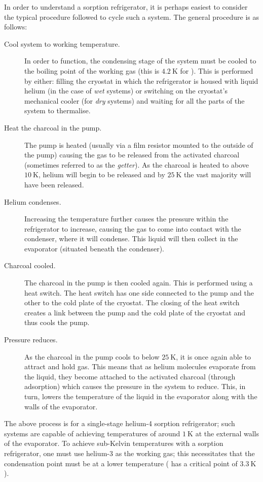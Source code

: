 \par
In order to understand a sorption refrigerator, it is perhaps easiest to consider the typical procedure followed to cycle such a system. The general procedure is as follows:
\begin{description}
\item[Cool system to working temperature.] In order to function, the condensing stage of the system must be cooled to the boiling point of the working gas (this is $4.2~\mathrm{K}$ for ). This is performed by either: filling the cryostat in which the refrigerator is housed with liquid helium (in the case of \textit{wet} systems) or switching on the cryostat's mechanical cooler (for \textit{dry} systems) and waiting for all the parts of the system to thermalise.
\item[Heat the charcoal in the pump.] The pump is heated (usually via a film resistor mounted to the outside of the pump) causing the gas to be released from the activated charcoal (sometimes referred to as the \textit{getter}). As the charcoal is heated to above $10~\mathrm{K}$, helium will begin to be released and by $25~\mathrm{K}$ the vast majority will have been released.
\item[Helium condenses.] Increasing the temperature further causes the pressure within the refrigerator to increase, causing the gas to come into contact with the condenser, where it will condense. This liquid will then collect in the evaporator (situated beneath the condenser).
\item[Charcoal cooled.] The charcoal in the pump is then cooled again. This is performed using a heat switch. The heat switch has one side connected to the pump and the other to the cold plate of the cryostat. The closing of the heat switch creates a link between the pump and the cold plate of the cryostat and thus cools the pump.
\item[Pressure reduces.] As the charcoal in the pump cools to below $25~\mathrm{K}$, it is once again able to attract and hold gas. This means that as helium molecules evaporate from the liquid, they become attached to the activated charcoal (through adsorption) which causes the pressure in the system to reduce. This, in turn, lowers the temperature of the liquid in the evaporator along with the walls of the evaporator.
\end{description}
\par
The above process is for a single-stage helium-4 sorption refrigerator; such systems are capable of achieving temperatures of around $1~\mathrm{K}$ at the external walls of the evaporator. To achieve sub-Kelvin temperatures with a sorption refrigerator, one must use helium-3 as the working gas; this necessitates that the condensation point must be at a lower temperature ( has a critical point of $3.3~\mathrm{K}$). 
